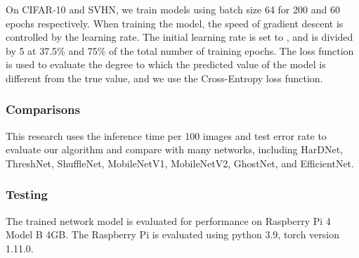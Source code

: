 \documentclass[default,iicol]{sn-jnl}
\theoremstyle{thmstyleone}\newtheorem{theorem}{Theorem}\newtheorem{proposition}[theorem]{Proposition}
\theoremstyle{thmstyletwo}\newtheorem{example}{Example}\newtheorem{remark}{Remark}
\theoremstyle{thmstylethree}\newtheorem{definition}{Definition}
\begin{document}
On CIFAR-10 and SVHN, we train models using batch size 64 for 200 and 60 epochs respectively. When training the model, the speed of gradient descent is controlled by the learning rate. The initial learning rate is set to , and is divided by 5 at 37.5\% and 75\% of the total number of training epochs. The loss function is used to evaluate the degree to which the predicted value of the model is different from the true value, and we use the Cross-Entropy loss function.

\subsubsection{Comparisons}
This research uses the inference time per 100 images and test error rate to evaluate our algorithm and compare with many networks, including HarDNet, ThreshNet, ShuffleNet, MobileNetV1, MobileNetV2, GhostNet, and EfficientNet.

\subsubsection{Testing}
The trained network model is evaluated for performance on Raspberry Pi 4 Model B 4GB. The Raspberry Pi is evaluated using python 3.9, torch version 1.11.0.
\end{document}
